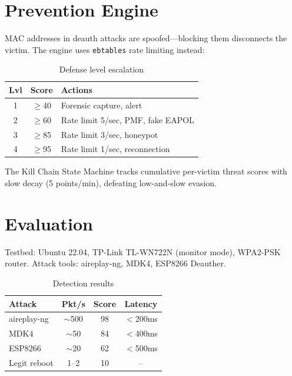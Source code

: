 \documentclass[conference]{IEEEtran}
\begin{document}
\section{Prevention Engine}

MAC addresses in deauth attacks are spoofed---blocking them disconnects the victim. The engine uses \texttt{ebtables} rate limiting instead:

\begin{table}[htbp]
\caption{Defense level escalation}
\label{tab:defense}
\centering
\small
\begin{tabular}{ccl}
\toprule
\textbf{Lvl} & \textbf{Score} & \textbf{Actions} \\
\midrule
1 & $\geq$40 & Forensic capture, alert \\
2 & $\geq$60 & Rate limit 5/sec, PMF, fake EAPOL \\
3 & $\geq$85 & Rate limit 3/sec, honeypot \\
4 & $\geq$95 & Rate limit 1/sec, reconnection \\
\bottomrule
\end{tabular}
\end{table}

The Kill Chain State Machine tracks cumulative per-victim threat scores with slow decay (5 points/min), defeating low-and-slow evasion.

\section{Evaluation}

Testbed: Ubuntu 22.04, TP-Link TL-WN722N (monitor mode), WPA2-PSK router. Attack tools: aireplay-ng, MDK4, ESP8266 Deauther.

\begin{table}[htbp]
\caption{Detection results}
\label{tab:detection}
\centering
\small
\begin{tabular}{lccc}
\toprule
\textbf{Attack} & \textbf{Pkt/s} & \textbf{Score} & \textbf{Latency} \\
\midrule
aireplay-ng & $\sim$500 & 98 & $<$200ms \\
MDK4 & $\sim$50 & 84 & $<$400ms \\
ESP8266 & $\sim$20 & 62 & $<$500ms \\
Legit reboot & 1--2 & 10 & -- \\
\bottomrule
\end{tabular}
\end{table}
\end{document}
